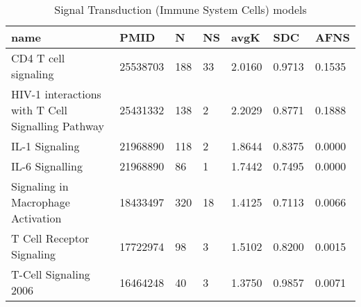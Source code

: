 \begin{table}
\centering
\caption{Signal Transduction (Immune System Cells) models}
\label{tab:Signal_Transduction_(Immune_System_Cells)}
\begin{tabular}{|p{180pt}||p{40pt}|p{25pt}|p{25pt}|p{40pt}|p{25pt}|p{25pt}|}
\toprule
 name & PMID & N &NS & avgK &SDC & AFNS \\
\midrule
CD4 T cell signaling & 25538703 & 188 & 33 & 2.0160 & 0.9713 & 0.1535 \\
HIV-1 interactions with T Cell Signalling Pathway & 25431332 & 138 & 2 & 2.2029 & 0.8771 & 0.1888 \\
IL-1 Signaling & 21968890 & 118 & 2 & 1.8644 & 0.8375 & 0.0000 \\
IL-6 Signalling & 21968890 & 86 & 1 & 1.7442 & 0.7495 & 0.0000 \\
Signaling in Macrophage Activation & 18433497 & 320 &18 & 1.4125 & 0.7113 & 0.0066 \\
T Cell Receptor Signaling & 17722974 & 98 & 3 & 1.5102 & 0.8200 & 0.0015 \\
T-Cell Signaling 2006 & 16464248 &40 & 3 & 1.3750 & 0.9857 & 0.0071 \\
\bottomrule
\end{tabular}
\end{table}
